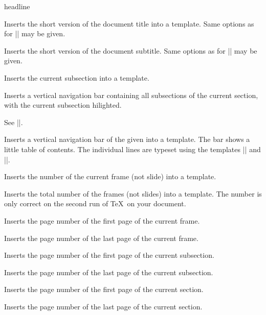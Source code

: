 \begin{element}{headline}
\begin{itemize}
    \iteminsert{\insertshorttitle}
    Inserts the short version of the document title into a template. Same
    options as for |\insertshortauthor| may be given. 

    \iteminsert{\insertshortsubtitle}
    Inserts the short version of the document subtitle. Same
    options as for |\insertshortauthor| may be given. 

    \iteminsert{\insertsubsection}
    Inserts the current subsection into a template.

    \iteminsert{\insertsubsectionnavigation}
    Inserts a vertical navigation bar containing all subsections of the
    current section, with the current subsection hilighted.

    \iteminsert{\insertsubsectionnavigationhorizontal}
    
    See |\insertsectionnavigationhorizontal|.

    \iteminsert{\insertverticalnavigation}
    Inserts a vertical navigation bar of the given  into a
    template. The bar shows a little table of contents. The individual
    lines are typeset using the templates
    |\usesectionsidetemplate| and |\usesubsectionsidetemplate|.

    \iteminsert{\insertframenumber}
    Inserts the number of the current frame (not slide) into a template.

    \iteminsert{\inserttotalframenumber}
    Inserts the total number of the frames (not slides) into a
    template. The number is only correct on the second run of \TeX\ on
    your document.

    \iteminsert{\insertframestartpage}
    Inserts the page number of the first page of the current frame.

    \iteminsert{\insertframeendpage}
    Inserts the page number of the last page of the current frame.

    \iteminsert{\insertsubsectionstartpage}
    Inserts the page number of the first page of the current subsection.

    \iteminsert{\insertsubsectionendpage}
    Inserts the page number of the last page of the current subsection.

    \iteminsert{\insertsectionstartpage}
    Inserts the page number of the first page of the current section.

    \iteminsert{\insertsectionendpage}
    Inserts the page number of the last page of the current section.


\end{itemize}
\end{element}
